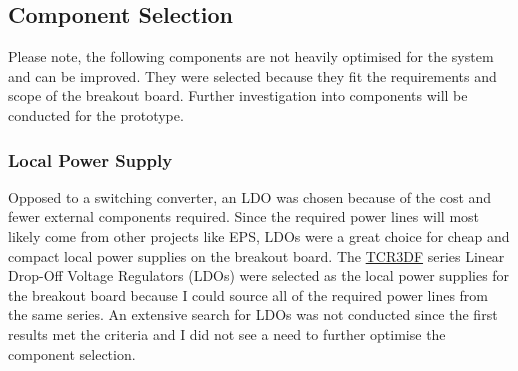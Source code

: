 \documentclass[10pt]{article}
\newcommand{\nl}{\newline \newline}
\begin{document}
\subsection{Component Selection}
Please note, the following components are not heavily optimised for the system and can be improved. They were selected because they fit the requirements and scope of the breakout board.
Further investigation into components will be conducted for the prototype.

\subsubsection{Local Power Supply}
Opposed to a switching converter, an LDO was chosen because of the cost and fewer external components required.
Since the required power lines will most likely come from other projects like EPS, LDOs were a great choice for cheap and compact local power supplies on the breakout board.
\nl
The \href{https://au.mouser.com/c/semiconductors/power-management-ics/voltage-regulators-voltage-controllers/ldo-voltage-regulators/?m=Toshiba&series=TCR3DF}{TCR3DF} series Linear Drop-Off Voltage Regulators (LDOs) were selected as the local power supplies for the breakout board because I could source all of the required power lines from the same series.
An extensive search for LDOs was not conducted since the first results met the criteria and I did not see a need to further optimise the component selection.

\end{document}
